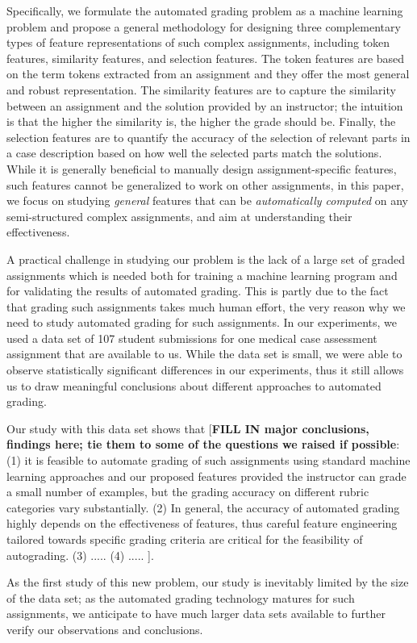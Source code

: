 Specifically, we formulate the automated grading problem as a machine
learning problem and propose a general methodology for designing three
complementary types of feature representations of such complex assignments,
including token features, similarity features, and selection features.  The
token features are based on the term tokens extracted from an assignment
and they offer the most general and robust representation. The similarity
features are to capture the similarity between an assignment and the
solution provided by an instructor; the intuition is that the higher the
similarity is, the higher the grade should be.  Finally, the selection
features are to quantify the accuracy of the selection of relevant parts in
a case description based on how well the selected parts match the
solutions.  While it is generally beneficial to manually design
assignment-specific features, such features cannot be generalized to work
on other assignments, in this paper, we focus on studying {\em general}
features that can be {\em automatically computed} on any semi-structured
complex assignments, and aim at understanding their effectiveness.

A practical challenge in studying our problem is the lack of a large set of
graded assignments which is needed both for training a machine learning
program and for validating the results of automated grading. This is partly
due to the fact that grading such assignments takes much human effort, the
very reason why we need to study automated grading for such assignments. In
our experiments, we used a data set of 107 student submissions for one
medical case assessment assignment that are available to us. While the data
set is small, we were able to observe statistically significant differences
in our experiments, thus it still allows us to draw meaningful conclusions
about different approaches to automated grading.

Our study with this data set shows that [{\bf FILL IN major conclusions,
 findings here; tie them to some of the questions we raised if possible}:
 (1) it is feasible to automate grading of such assignments using standard
 machine learning approaches and our proposed features provided the
 instructor can grade a small number of examples, but the grading accuracy
 on different rubric categories vary substantially.  (2) In general, the
 accuracy of automated grading highly depends on the effectiveness of
 features, thus careful feature engineering tailored towards specific
 grading criteria are critical for the feasibility of autograding.  (3)
..... (4) ..... ].

As the first study of this new problem, our study is inevitably limited by
the size of the data set; as the automated grading technology matures for
such assignments, we anticipate to have much larger data sets available to
further verify our observations and conclusions.
